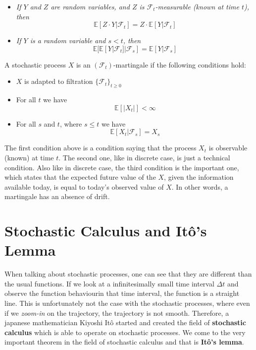 \documentclass[times, utf8, diplomski]{fer}
\begin{document}
\begin{itemize}
	\item \textit{If $Y$ and $Z$ are random variables, and $Z$ is $\mathcal{F}_t$-measurable (known at time $t$), then} $$\mathbb{E}[Z\cdot Y|\mathcal{F}_t] = Z \cdot \mathbb{E}[Y|\mathcal{F}_t]$$
	\item \textit{If $Y$ is a random variable and $s<t$, then} $$\mathbb{E}[\mathbb{E}[Y|\mathcal{F}_t]|\mathcal{F}_s] = \mathbb{E}[Y|\mathcal{F}_s]$$
\end{itemize}

\begin{definition}
A stochastic process $X$ is an $(\mathcal{F}_t)$-martingale if the following conditions hold:
\begin{itemize}
	\item $X$ is adapted to filtration $\{\mathcal{F}_t\}_{t\geq 0}$
	\item For all $t$ we have $$\mathbb{E}[|X_t|] < \infty$$
	\item For all $s$ and $t$, where $s\leq t$ we have $$\mathbb{E}[X_t|\mathcal{F}_s] = X_s$$
\end{itemize}
\end{definition}

\noindent The first condition above is a condition saying that the process $X_t$ is observable (known) at time $t$. The second one, like in discrete case, is just a technical condition. Also like in discrete case, the third condition is the important one, which states that the expected future value of the $X$, given the information available today, is equal to today's observed value of $X$. In other words, a martingale has an absence of drift.

\section{Stochastic Calculus and It\^{o}'s Lemma}
When talking about stochastic processes, one can see that they are different than the usual functions. If we look at a infinitesimally small time interval $\Delta t$ and observe the function behaviourin that time interval, the function is a straight line. This is unfortunately not the case with the stochastic processes, where even if we \textit{zoom-in} on the trajectory, the trajectory is not smooth. Therefore, a japanese mathematician Kiyoshi It\^{o} started and created the field of \textbf{stochastic calculus} which is able to operate on stochastic processes. We come to the very important theorem in the field of stochastic calculus and that is \textbf{It\^{o}'s lemma}.
\end{document}
